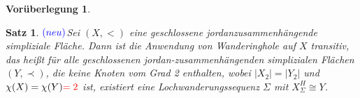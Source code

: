 \documentclass[12pt,titlepage]{article}
\newtheorem{vor}{Vorüberlegung}[section]
\newtheorem{satz}{Satz}[section]
\begin{document}
\begin{vor}
\begin{comment}
\draw [fill=qqqqff] (15.472748279615585,-1.3030754963192541) circle (2.5pt);
\draw [fill=qqqqff] (18.209744022446607,-2.2961582030819834) circle (2.5pt);
\draw [fill=ududff] (17.634879619911473,-0.0057522600151186645) circle (2.5pt);
\draw[color=black] (16.48951643235073,-0.12459017384731824) node {$p_2$};
\draw[color=black] (16.823994350502115,-1.880599244142104) node {$q_4$};
\draw[color=black] (18.297787677356666,-0.8876179246301714) node {$o$};
\draw[color=black] (16.907613830039963,1.2969409782960795) node {$o_1$};
\draw[color=black] (15.297938848936411,0.3980315732642251) node %
\draw[color=black] (20.565966059820767,1.7568481157542377) node {$m_3$};
\draw [fill=xdxdff] (11.11562696037146,0.) circle (2.5pt);

\draw [fill=xdxdff] (13.196890720224609,0.) circle (2.5pt);

\draw [fill=ududff] (12.921429340244044,0.4839568599503282) circle (2.5pt);
\draw [fill=ududff] (12.829608880250523,-0.3730340999892038) circle (2.5pt);

\end{scriptsize}
\end{axis}
\end{tikzpicture} 
\end{figure}
\end{comment}
\end{vor}
\begin{satz}$\textcolor{blue}{(neu)}$\label{WH}
Sei $(X,<)$ eine geschlossene jordanzusammenhängende simpliziale Fläche. Dann ist die Anwendung von Wanderinghole auf $X$ transitiv, das heißt für alle geschlossenen jordan-zusammenhängenden simplizialen Flächen $(Y,\prec)$, die keine Knoten vom Grad 2 enthalten, wobei $\vert X_2 \vert = \vert Y_2 \vert$ und $\chi(X)=\chi(Y)\textcolor{red}{=2}$ ist, existiert eine Lochwanderungssequenz $\Sigma$ mit $X^H_{\Sigma} \cong Y$.
\end{satz}
\end{document}

